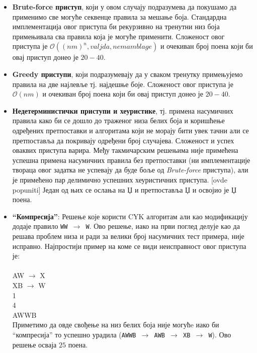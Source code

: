 \documentclass[a4wide]{article}
\begin{document}
\begin{itemize}
\item {\bf Brute-force приступ}, који у овом случају подразумева да покушамо да применимо све могуће секвенце правила за мешање боја. Стандардна имплементација овог приступа би рекурзивно на тренутни низ боја примењивала сва правила која је могуће применити. Сложеност овог приступа је $\mathcal{O}((nm)^n, valjda, nemam blage)$ и очекиван број поена који би овај приступ донео је $20-40$.
\item {\bf Greedy приступи}, који подразумевају да у сваком тренутку примењујемо правила на две најлевље тј. најдешње боје. Сложеност овог приступа је $\mathcal{O}(nm)$ и очекиван број поена који би овај приступ донео је $20-40$.
\item {\bf Недетерминистички приступи и хеуристике}, тј. примена насумичних правила како би се дошло до траженог низа белих боја и коришћење одређених претпоставки и алгоритама који не морају бити увек тачни али се претпоставља да покривају одређени број случајева. Сложеност и успех оваквих приступа варира. Међу такмичарским решењима није примећена успешна примена насумичних правила без претпоставки (ни имплементације твораца овог задатка не успевају да буде боље од \textit{Brute-force} приступа), али је примећено пар делимично успешних хеуристичних приступа. [ovde popuniti] Један од њих се ослања на Џ и претпоставља Џ и освојио је Џ поена.
\item {\bf ``Компресија''}: Решење које користи CYK алгоритам али као модификацију додаје правило {\tt WW $\to$ W}. Ово решење, иако на први поглед делује као да решава проблем низа и ради за велики број насумичних тест примера, није исправно. Најпростији пример на коме се види неисправност овог приступа је:\\
\\
AW $\to$ X\\
XB $\to$ W\\
1\\
4\\
AWWB\\
\linebreak
\noindent Приметимо да овде свођење на низ белих боја није могућe иако би ``компресија'' то успешно урадила ({\tt AWWB $\to$ AWB $\to$ XB $\to$ W}). Ово решење осваја $25$ поена.
\end{itemize} 
\end{document}
